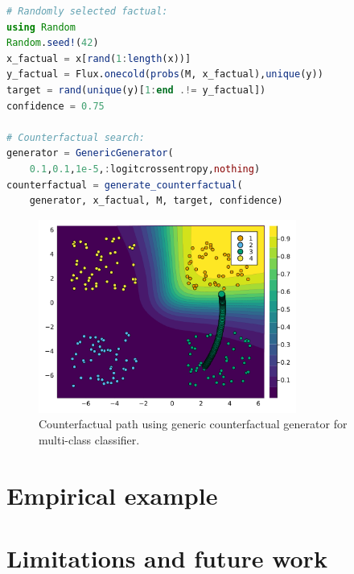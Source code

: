 \documentclass{juliacon}
\begin{document}
\begin{lstlisting}[language = Julia]
# Randomly selected factual:
using Random
Random.seed!(42)
x_factual = x[rand(1:length(x))]
y_factual = Flux.onecold(probs(M, x_factual),unique(y))
target = rand(unique(y)[1:end .!= y_factual]) 
confidence = 0.75

# Counterfactual search:
generator = GenericGenerator(
    0.1,0.1,1e-5,:logitcrossentropy,nothing)
counterfactual = generate_counterfactual(
    generator, x_factual, M, target, confidence)
\end{lstlisting}

\begin{figure}

{\centering \includegraphics[width=3.33333in,height=2.5in]{www/ce_multi.png}

}

\caption{\label{fig-multi}Counterfactual path using generic
counterfactual generator for multi-class classifier.}

\end{figure}

\hypertarget{empirical-example}{%
\section{Empirical example}\label{empirical-example}}

\hypertarget{limitations-and-future-work}{%
\section{Limitations and future
work}\label{limitations-and-future-work}}


\end{document}
